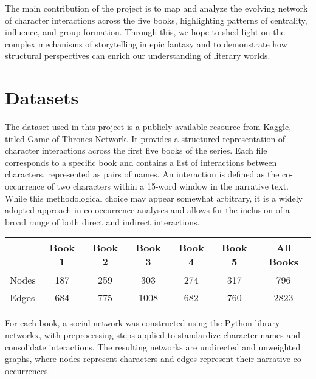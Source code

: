 \documentclass[12pt, a4paper]{article}
\begin{document}
The main contribution of the project is to map and analyze the evolving network of character interactions across the five books, highlighting patterns of centrality, influence, and group formation. Through this, we hope to shed light on the complex mechanisms of storytelling in epic fantasy and to demonstrate how structural perspectives can enrich our understanding of literary worlds.

\section{Datasets}
\label{datasets}
\begin{comment}
(Python Colab Notebook, GameOfThrones dataset public on kaggle)
How did you gather the data? Did you digitise it? How? Is the material
publicly available? What tools did you use 1) to handle (store,
manipulate) the data and 2) to compute measures on the data?
\end{comment}
The dataset used in this project is a publicly available resource from Kaggle, titled Game of Thrones Network. It provides a structured representation of character interactions across the first five books of the series. Each file corresponds to a specific book and contains a list of interactions between characters, represented as pairs of names. An interaction is defined as the co-occurrence of two characters within a 15-word window in the narrative text. While this methodological choice may appear somewhat arbitrary, it is a widely adopted approach in co-occurrence analyses and allows for the inclusion of a broad range of both direct and indirect interactions.

\begin{table}[ht] \centering
\begin{tabular}{lcccccc}
\hline
\textbf{} & \textbf{Book 1} & \textbf{Book 2} & \textbf{Book 3} & \textbf{Book 4} & \textbf{Book 5} & \textbf{All Books} \\
\hline
Nodes & 187 & 259 & 303 & 274 & 317 & 796 \\
Edges & 684 & 775 & 1008 & 682 & 760 & 2823 \\
\hline
\end{tabular}
\end{table}

For each book, a social network was constructed using the Python library networkx, with preprocessing steps applied to standardize character names and consolidate interactions. The resulting networks are undirected and unweighted graphs, where nodes represent characters and edges represent their narrative co-occurrences.
\end{document}
